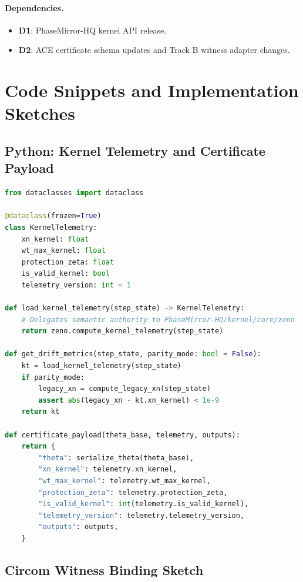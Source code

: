 \documentclass[11pt]{article}
\begin{document}
\paragraph{Dependencies.}
\begin{itemize}[leftmargin=*]
  \item \textbf{D1}: PhaseMirror-HQ kernel API release.
  \item \textbf{D2}: ACE certificate schema updates and Track B witness adapter changes.
\end{itemize}

\section{Code Snippets and Implementation Sketches}

\subsection{Python: Kernel Telemetry and Certificate Payload}

\begin{lstlisting}[style=code,language=Python]
from dataclasses import dataclass

@dataclass(frozen=True)
class KernelTelemetry:
    xn_kernel: float
    wt_max_kernel: float
    protection_zeta: float
    is_valid_kernel: bool
    telemetry_version: int = 1

def load_kernel_telemetry(step_state) -> KernelTelemetry:
    # Delegates semantic authority to PhaseMirror-HQ/kernel/core/zeno
    return zeno.compute_kernel_telemetry(step_state)

def get_drift_metrics(step_state, parity_mode: bool = False):
    kt = load_kernel_telemetry(step_state)
    if parity_mode:
        legacy_xn = compute_legacy_xn(step_state)
        assert abs(legacy_xn - kt.xn_kernel) < 1e-9
    return kt

def certificate_payload(theta_base, telemetry, outputs):
    return {
        "theta": serialize_theta(theta_base),
        "xn_kernel": telemetry.xn_kernel,
        "wt_max_kernel": telemetry.wt_max_kernel,
        "protection_zeta": telemetry.protection_zeta,
        "is_valid_kernel": int(telemetry.is_valid_kernel),
        "telemetry_version": telemetry.telemetry_version,
        "outputs": outputs,
    }
\end{lstlisting}

\subsection{Circom Witness Binding Sketch}
\end{document}
